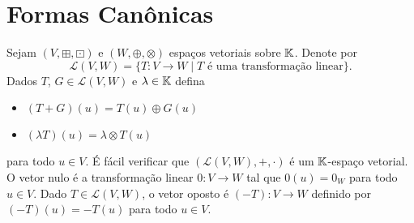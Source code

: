\chapter{Formas Can\^onicas}

Sejam $(V,\boxplus,\boxdot)$ e $(W,\oplus,\otimes)$ espa\c{c}os vetoriais sobre $\mathbb{K}$. Denote por
\[
	\mathcal{L}(V,W) = \{T : V \to W \mid T \mbox{ \'e uma transforma\c{c}\~ao linear}\}.
\]
Dados $T$, $G \in \mathcal{L}(V,W)$ e $\lambda \in \mathbb{K}$ defina
\begin{itemize}
	\item $(T + G)(u) = T(u) \oplus G(u)$
	\item $(\lambda T)(u) = \lambda\otimes T(u)$
\end{itemize}
para todo $u \in V$. \'E f\'acil verificar que $(\mathcal{L}(V,W),+,\cdot)$ \'e um $\mathbb{K}$-espa\c{c}o vetorial. O vetor nulo \'e a transforma\c{c}\~ao linear $0 : V \to W$ tal que $0(u) = 0_W$ para todo $u \in V$. Dado $T \in \mathcal{L}(V,W)$, o vetor oposto \'e $(-T) : V \to W$ definido por $(-T)(u) = -T(u)$ para todo $u \in V$.

